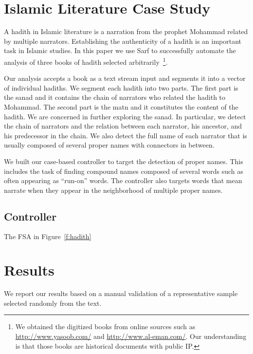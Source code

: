 \documentclass[11pt,letterpaper]{article}
\begin{document}
\section{Islamic Literature Case Study}
\label{sec:islamic}

A hadith in Islamic literature is a narration from the prophet Mohammad
related by multiple narrators.
Establishing the authenticity of a hadith is an important task
in Islamic studies. 
In this paper we use Sarf to successfully automate the
analysis of three books of hadith selected 
arbitrarily~\cite{IbnHanbal,AlKulayni,AlTousi}\footnote{We obtained
  the digitized books from online sources such as 
  \href{http://www.yasoob.com/}{http://www.yasoob.com/} and 
  \href{http://www.al-eman.com/}{http://www.al-eman.com/}. 
  Our understanding is that those books are historical documents with 
  public IP.}.

Our analysis accepts a book as a text stream input
and segments it into a vector of individual hadiths. 
We segment each hadith into two parts. The first part
is the sanad and it
contains the chain of narrators who related the hadith
to Mohammad. 
The second part is the matn and it constitutes the content
of the hadith. 
We are concerned in further exploring the sanad. 
In particular, we detect the chain of narrators
and the relation between each narrator, his ancestor, and 
his predecessor in the chain. 
We also detect the full name of each narrator that is
usually composed of several proper names with connectors
in between. 

We built our case-based controller to target
the detection of proper names. 
This includes the task of finding compound names 
composed of several words such as  often
appearing as ``run-on'' words.
The controller also targets words that mean narrate when
they appear in the neighborhood of multiple proper names. 

\subsection{Controller}
The FSA in Figure~\ref{f:hadith}


\section{Results}
\label{sec:results}

We report our results based on a manual validation of 
a representative sample selected randomly from the text.
\end{document}
